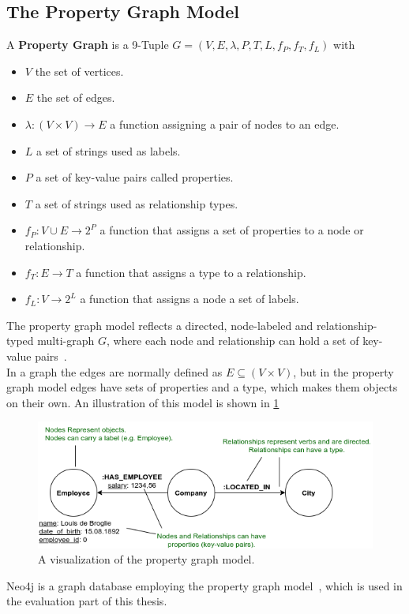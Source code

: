 \documentclass[a4paper,10pt]{article}
\begin{document}
    \subsection{The Property Graph Model}
A \textbf{Property Graph} is a 9-Tuple $G = (V, E, \lambda, P, T, L, f_P, f_T, f_L)$ with 
\begin{itemize}
    \item $V$ the set of vertices.
    \item $E$ the set of edges.
    \item $\lambda: (V \times V) \rightarrow E$ a function assigning a pair of nodes to an edge.
    \item $L$ a set of strings used as labels.
    \item $P$ a set of key-value pairs called properties.
    \item $T$ a set of strings used as relationship types.
    \item $f_P: V \cup E \rightarrow 2^P$ a function that assigns a set of properties to a node or relationship.
   \item $f_T: E \rightarrow T$ a function that assigns a type to  a relationship.
   \item  $f_L: V \rightarrow 2^L$ a function that assigns a node a set of labels.
\end{itemize} 
\smallskip
The property graph model reflects a directed, node-labeled and relationship-typed multi-graph $G$, where each node and relationship can hold a set of key-value pairs~\autocite{angles2018property}. \\
    In a graph the edges are normally defined as $E \subseteq (V \times V)$, but in the property graph model edges have sets of properties and a type, which makes them objects on their own.
    An illustration of this model is shown in \ref{fig:propertygraph}
            \begin{figure}[htp]\label{fig:propertygraph}
        \begin{center}
        \includegraphics[keepaspectratio,width=\textwidth]{img/property_graph_elements.png}
        \end{center}
        \caption{A visualization of the property graph model.} %
        \end{figure}
Neo4j is a graph database employing the property graph model~\cite{robinson2013graph}, which is used in the evaluation part of this thesis.
\end{document}
